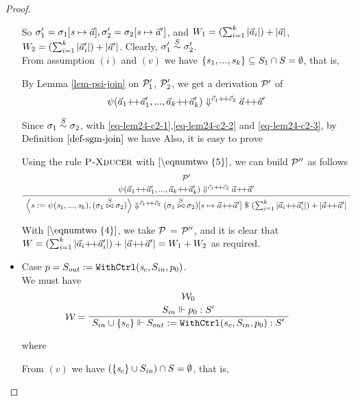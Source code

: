 \begin{proof}
\begin{itemize}
	So  $\sgm_1' = \sgm_1[\s \|-> \a], \sgm_2' = \sgm_2[\s \|-> \a']$, and $W_1 = (\sum_{i=1}^{k}|\a_i|) + |\a|$, $W_2 = (\sum_{i=1}^{k}|\a'_i|) + |\a'|$. 
	Clearly, $\sgm_1' \~\S \sgm_2'$. \\
	
	From assumption $(i)$ and $(v)$ we have $\{s_1,...,s_k\} \subseteq \S_1 \cap \S = \emptyset$,
    that is, 

    
    By Lemma \ref{lem-psi-join} on $\MP'_{1}$, $\MP'_{2}$, we get a derivation $\MP'$ of 
    \[ \sevalfg{\lcall}{\a_1  {\++} \a_1',...,\a_k {\++} \a_k' } 
             {\c_1 {\++} \c_2} {\a {\++} \a'} \]
    
    Since $\sgm_1 \~{\S} \sgm_2$, 
    with \eqref{eq-lem24-c2-1},\eqref{eq-lem24-c2-2} and \eqref{eq-lem24-c2-3}, 
    by Definition $\ref{def-sgm-join}$ we have
 	Also, it is easy to prove 
 
    Using the rule $\PName{Xducer}$ with $\eqref{\eqnumtwo{5}}$, we can build $\MP''$ as follows
   	$$\PT{\UCN{\MP'}{\sevalfg{\lcall}{\a_1  {\++} \a_1',...,\a_k {\++} \a_k' } 
   			{\c_1 {\++} \c_2} {\a {\++} \a'}}
    	\UC{\seval{\casetwo}{\sgmx}{\c_1 {\++} \c_2}{\sgmx[\s \|-> \a {\++} \a']}{(\sum_{i=1}^{k}|\a_i{\++}\a'_i|) + |\a{\++} \a'|}}
    } $$
   
   
    With $\eqref{\eqnumtwo{4}}$, we take $\MP$  = $\MP''$,
    and it is clear that $W = (\sum_{i=1}^{k}|\a_i{\++}\a'_i|) + |\a{\++} \a'| = W_1 + W_2$ as required.
 
   	

\item Case $p = \withctrl{\s_c}{p_0}{\Sin}{\Sout}$.\\
\def\eqnumthree#1{eq-lem24-c3-{#1}}
	We must have  
	$$
		\PT{\UCN{\MW_0}{\wf{p_0}{\Sin}{S'}}
			\LeLa{\MW = }		
			\UC{\wf{\withctrl{s_c}{p_0}{\Sin}{\Sout}}{\Sin \cup \{s_c\}}{\S'}}  
	}$$

where  
 
From $(v)$ we have $(\{\s_c\} \cup \Sin) \cap \S = \emptyset$, that is,
		
\def\casethree{\withctrl{\s_c}{p_0}{\Sin}{\Sout}}


\end{itemize}
\end{proof}
